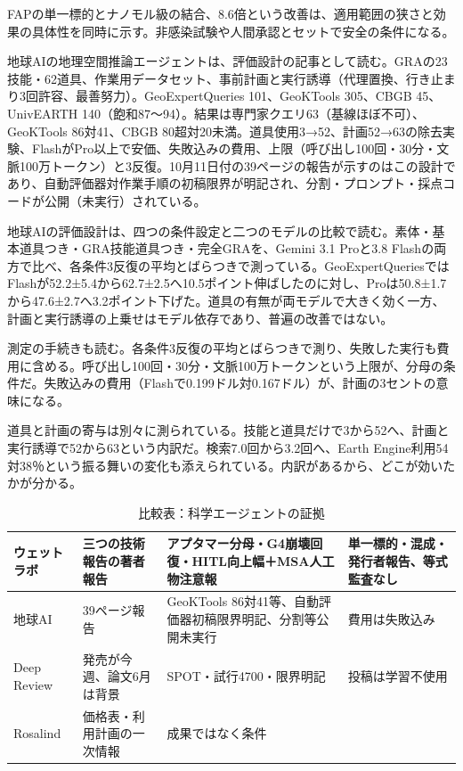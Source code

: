 \documentclass[lualatex,a4paper,10pt]{jlreq}
\begin{document}
FAPの単一標的とナノモル級の結合、8.6倍という改善は、適用範囲の狭さと効果の具体性を同時に示す。非感染試験や人間承認とセットで安全の条件になる。
\cite{B46,B83,B44,B43,B45}


地球AIの地理空間推論エージェントは、評価設計の記事として読む。GRAの23技能・62道具、作業用データセット、事前計画と実行誘導（代理置換、行き止まり3回許容、最善努力）。GeoExpertQueries 101、GeoKTools 305、CBGB 45、UnivEARTH 140（飽和87〜94）。結果は専門家クエリ63（基線ほぼ不可）、GeoKTools 86対41、CBGB 80超対20未満。道具使用3→52、計画52→63の除去実験、FlashがPro以上で安価、失敗込みの費用、上限（呼び出し100回・30分・文脈100万トークン）と3反復。10月11日付の39ページの報告が示すのはこの設計であり、自動評価器対作業手順の初稿限界が明記され、分割・プロンプト・採点コードが公開（未実行）されている。
\cite{B47,B84,B48,B61}


地球AIの評価設計は、四つの条件設定と二つのモデルの比較で読む。素体・基本道具つき・GRA技能道具つき・完全GRAを、Gemini 3.1 Proと3.8 Flashの両方で比べ、各条件3反復の平均とばらつきで測っている。GeoExpertQueriesではFlashが52.2±5.4から62.7±2.5へ10.5ポイント伸ばしたのに対し、Proは50.8±1.7から47.6±2.7へ3.2ポイント下げた。道具の有無が両モデルで大きく効く一方、計画と実行誘導の上乗せはモデル依存であり、普遍の改善ではない。
\cite{B47,B84,B48}


測定の手続きも読む。各条件3反復の平均とばらつきで測り、失敗した実行も費用に含める。呼び出し100回・30分・文脈100万トークンという上限が、分母の条件だ。失敗込みの費用（Flashで0.199ドル対0.167ドル）が、計画の3セントの意味になる。
\cite{B47,B84,B48}


道具と計画の寄与は別々に測られている。技能と道具だけで3から52へ、計画と実行誘導で52から63という内訳だ。検索7.0回から3.2回へ、Earth Engine利用54対38％という振る舞いの変化も添えられている。内訳があるから、どこが効いたかが分かる。
\cite{B47,B84,B48}


\begin{table}[htbp]\centering\footnotesize
\caption{比較表：科学エージェントの証拠}
\begin{tabularx}{0.96\linewidth}{@{}lXXX@{}}
\toprule
ウェットラボ & 三つの技術報告の著者報告 & アプタマー分母・G4崩壊回復・HITL向上幅＋MSA人工物注意報 & 単一標的・混成・発行者報告、等式監査なし \cite{B46,B83,B44,B43} \\
\midrule
地球AI & 39ページ報告 & GeoKTools 86対41等、自動評価器初稿限界明記、分割等公開未実行 & 費用は失敗込み \cite{B47,B84,B48} \\
\midrule
Deep Review & 発売が今週、論文6月は背景 & SPOT・試行4700・限界明記 & 投稿は学習不使用 \cite{B50,B85,B49} \\
\midrule
Rosalind & 価格表・利用計画の一次情報 & 成果ではなく条件 \cite{B51,B86} \\
\bottomrule
\end{tabularx}
\end{table}
\end{document}
